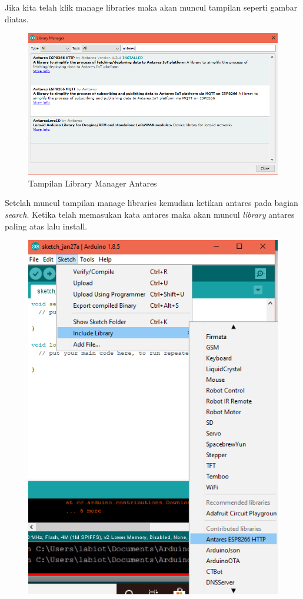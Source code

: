 \begin{enumerate}
    \par Jika kita telah klik manage libraries maka akan muncul tampilan seperti gambar diatas.
     \begin{figure}[H]
    \centering
    \includegraphics[width=1\textwidth]{figures/manager8.png}
    \caption{Tampilan Library Manager Antares}
    \label{print}
    \end{figure}
    \par Setelah muncul tampilan manage libraries kemudian ketikan antares pada bagian \textit{search}. Ketika telah memasukan kata antares maka akan muncul \textit{library} antares paling atas lalu install.
    \begin{figure}[H]
    \centering
    \includegraphics[width=1\textwidth]{figures/manageinclude.png}

\end{figure}
\end{enumerate}
